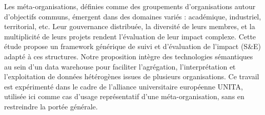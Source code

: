 Les méta-organisations, définies comme des groupements d'organisations autour d’objectifs communs, émergent dans des domaines variés : académique, industriel, territorial, etc. Leur gouvernance distribuée, la diversité de leurs membres, et la multiplicité de leurs projets rendent l’évaluation de leur impact complexe. Cette étude propose un framework générique de suivi et d’évaluation de l’impact (S\&E) adapté à ces structures. Notre proposition intègre des technologies sémantiques au sein d’un data warehouse pour faciliter l’agrégation, l’interprétation et l’exploitation de données hétérogènes issues de plusieurs organisations.
Ce travail est expérimenté dans le cadre de l’alliance universitaire européenne UNITA, utilisée ici comme cas d’usage représentatif d’une méta-organisation, sans en restreindre la portée générale.